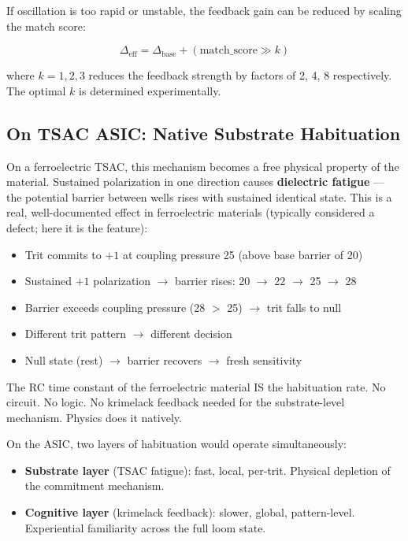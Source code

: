 \documentclass[11pt,a4paper]{article}
\begin{document}
If oscillation is too rapid or unstable, the feedback gain can be reduced by scaling the match score:

\begin{equation}
\Delta_{\text{eff}} = \Delta_{\text{base}} + (\text{match\_score} \gg k)
\end{equation}

where $k = 1, 2, 3$ reduces the feedback strength by factors of 2, 4, 8 respectively. The optimal $k$ is determined experimentally.

\subsection{On TSAC ASIC: Native Substrate Habituation}

On a ferroelectric TSAC, this mechanism becomes a free physical property of the material. Sustained polarization in one direction causes \textbf{dielectric fatigue} --- the potential barrier between wells rises with sustained identical state. This is a real, well-documented effect in ferroelectric materials (typically considered a defect; here it is the feature):

\begin{itemize}
    \item Trit commits to $+1$ at coupling pressure 25 (above base barrier of 20)
    \item Sustained $+1$ polarization $\rightarrow$ barrier rises: 20 $\rightarrow$ 22 $\rightarrow$ 25 $\rightarrow$ 28
    \item Barrier exceeds coupling pressure (28 $>$ 25) $\rightarrow$ trit falls to null
    \item Different trit pattern $\rightarrow$ different decision
    \item Null state (rest) $\rightarrow$ barrier recovers $\rightarrow$ fresh sensitivity
\end{itemize}

The RC time constant of the ferroelectric material IS the habituation rate. No circuit. No logic. No krimelack feedback needed for the substrate-level mechanism. Physics does it natively.

On the ASIC, two layers of habituation would operate simultaneously:
\begin{itemize}
    \item \textbf{Substrate layer} (TSAC fatigue): fast, local, per-trit. Physical depletion of the commitment mechanism.
    \item \textbf{Cognitive layer} (krimelack feedback): slower, global, pattern-level. Experiential familiarity across the full loom state.
\end{itemize}
\end{document}
